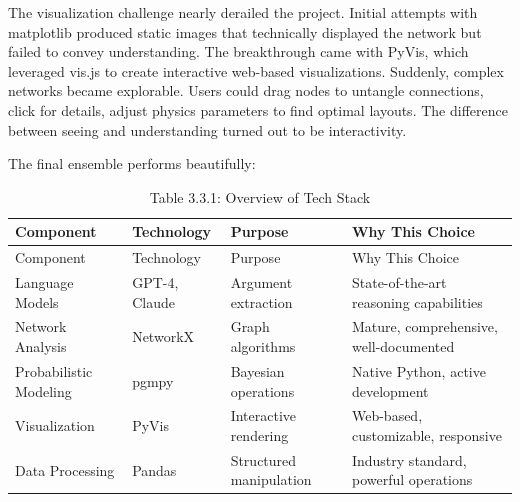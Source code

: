 \documentclass[
  11pt,
  letterpaper,
  openany]{book}
\begin{document}
The visualization challenge nearly derailed the project. Initial
attempts with matplotlib produced static images that technically
displayed the network but failed to convey understanding. The
breakthrough came with PyVis, which leveraged vis.js to create
interactive web-based visualizations. Suddenly, complex networks became
explorable. Users could drag nodes to untangle connections, click for
details, adjust physics parameters to find optimal layouts. The
difference between seeing and understanding turned out to be
interactivity.

The final ensemble performs beautifully:

\begin{longtable}[]{@{}
  >{\raggedright\arraybackslash}p{}
  >{\raggedright\arraybackslash}p{}
  >{\raggedright\arraybackslash}p{}
  >{\raggedright\arraybackslash}p{}@{}}
\caption{Table 3.3.1: Overview of Tech
Stack}\label{tbl-tech-stack}\tabularnewline
\toprule\noalign{}
\begin{minipage}[b]{\linewidth}\raggedright
Component
\end{minipage} & \begin{minipage}[b]{\linewidth}\raggedright
Technology
\end{minipage} & \begin{minipage}[b]{\linewidth}\raggedright
Purpose
\end{minipage} & \begin{minipage}[b]{\linewidth}\raggedright
Why This Choice
\end{minipage} \\
\midrule\noalign{}
\endfirsthead
\toprule\noalign{}
\begin{minipage}[b]{\linewidth}\raggedright
Component
\end{minipage} & \begin{minipage}[b]{\linewidth}\raggedright
Technology
\end{minipage} & \begin{minipage}[b]{\linewidth}\raggedright
Purpose
\end{minipage} & \begin{minipage}[b]{\linewidth}\raggedright
Why This Choice
\end{minipage} \\
\midrule\noalign{}
\endhead
\bottomrule\noalign{}
\endlastfoot
Language Models & GPT-4, Claude & Argument extraction & State-of-the-art
reasoning capabilities \\
Network Analysis & NetworkX & Graph algorithms & Mature, comprehensive,
well-documented \\
Probabilistic Modeling & pgmpy & Bayesian operations & Native Python,
active development \\
Visualization & PyVis & Interactive rendering & Web-based, customizable,
responsive \\
Data Processing & Pandas & Structured manipulation & Industry standard,
powerful operations \\
\end{longtable}
\end{document}
